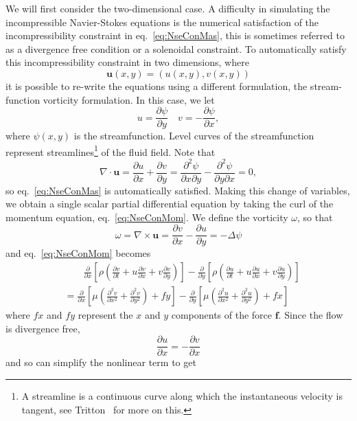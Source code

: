 We will first consider the two-dimensional case. A difficulty in simulating the incompressible Navier-Stokes equations is the numerical satisfaction of the incompressibility constraint in eq.\ \eqref{eq:NseConMas}, this is sometimes referred to as a divergence free condition or a solenoidal constraint. To automatically satisfy this incompressibility constraint in two dimensions, where
$$\mathbf u(x,y)=\left(u(x,y),v(x,y)\right)$$
it is possible to re-write the equations using a different formulation, the stream-function vorticity formulation. In this case, we let 
$$u=\frac{\partial \psi}{\partial y}  \quad v=-\frac{\partial \psi}{\partial x},$$ 
where $\psi(x,y)$ is the streamfunction.  Level curves of the streamfunction represent streamlines\footnote{A streamline is a continuous curve along which the instantaneous velocity is tangent, see Tritton~\cite{Tri88} for more on this.} of the fluid field. Note that 
$$\nabla\cdot\mathbf u =\frac{\partial u}{\partial x}+\frac{\partial v}{\partial y}= \frac{\partial^2\psi}{\partial x \partial y} - \frac{\partial^2\psi}{\partial y \partial x}=0,$$
so eq.\ \eqref{eq:NseConMas} is automatically satisfied. Making this change of variables, we obtain a single scalar partial differential equation by taking the curl of the momentum equation, eq.\ \eqref{eq:NseConMom}. We define the vorticity $\omega$, so that
$$\omega=\nabla\times\mathbf u= \frac{\partial v}{\partial x}-\frac{\partial u}{\partial y}=-\Delta \psi$$
and eq.\ \eqref{eq:NseConMom} becomes
\begin{align*}
&{}\hspace{2em}
\frac{\partial }{\partial x} \left[\rho\left(\frac{\partial v}{\partial t} +u \frac{\partial v}{\partial x} +v\frac{\partial v}{\partial y}\right) \right]
- \frac{\partial }{\partial y} \left[\rho\left(\frac{\partial u}{\partial t} +u \frac{\partial u}{\partial x} +v\frac{\partial u}{\partial y}\right) \right]
\\&{}=\frac{\partial }{\partial x} \left[\mu\left(\frac{\partial^2 v}{\partial x^2} + \frac{\partial^2 v}{\partial y^2}\right) + fy \right]
-\frac{\partial }{\partial y} \left[\mu\left(\frac{\partial^2 u}{\partial x^2} + \frac{\partial^2 u}{\partial y^2}\right) + fx \right]
\end{align*}
where $fx$ and $fy$ represent the $x$ and $y$ components of the force $\mathbf f$. Since the flow is divergence free, 
$$\frac{\partial u}{\partial x}=-\frac{\partial v}{\partial x}$$
and so can simplify the nonlinear term to get
